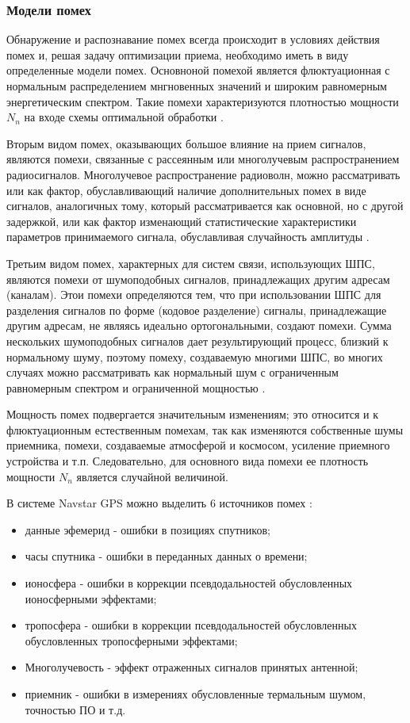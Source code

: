 \subsubsection{Модели помех}
\label{l:noise_model}
Обнаружение и распознавание помех всегда происходит в условиях действия помех и, решая задачу оптимизации приема,
необходимо иметь в виду определенные модели помех. Основноной помехой является флюктуационная с нормальным
распределением мнгновенных значений и широким равномерным энергетическим спектром. Такие помехи характеризуются
плотностью мощности ${N_n}$ на входе схемы оптимальной обработки \cite{pestryakov-book}.

Вторым видом помех, оказывающих
большое влияние на прием сигналов, являются помехи, связанные с рассеянным или многолучевым распространением
радиосигналов. Многолучевое распространение радиоволн, можно рассматривать или как фактор, обуславливающий
наличие дополнительных помех в виде сигналов, аналогичных тому, который рассматривается как основной, но с другой
задержкой, или как фактор изменающий статистические характеристики параметров принимаемого сигнала,
обуславливая случайность амплитуды \cite{pestryakov-book}.

Третьим видом помех, характерных для систем связи, использующих ШПС, являются помехи от шумоподобных сигналов,
принадлежащих другим адресам (каналам). Этои помехи определяются тем, что при использовании ШПС для разделения
сигналов по форме (кодовое разделение) сигналы, принадлежащие другим адресам, не являясь идеально ортогональными,
создают помехи. Сумма нескольких шумоподобных сигналов дает результирующий процесс, близкий к нормальному шуму,
поэтому помеху, создаваемую многими ШПС, во многих случаях можно рассматривать как нормальный шум с ограниченным
равномерным спектром и ограниченной мощностью \cite{pestryakov-book}.

Мощность помех подвергается значительным изменениям; это относится и к флюктуационным естественным помехам, так как
изменяются собственные шумы приемника, помехи, создаваемые атмосферой и космосом, усиление приемного устройства
и т.п. Следовательно, для основного вида помехи ее плотность мощности ${N_n}$ является случайной величиной.

В системе Navstar GPS можно выделить 6 источников помех \cite{parkinson_1996}:
\begin{itemize}
	\item {данные эфемерид - ошибки в позициях спутников;}
	\item {часы спутника - ошибки в переданных данных о времени;}
	\item {ионосфера - ошибки в коррекции псевдодальностей обусловленных ионосферными эффектами;}
	\item {тропосфера - ошибки в коррекции псевдодальностей обусловленных обусловленных тропосферными эффектами;}
	\item {Многолучевость - эффект отраженных сигналов принятых антенной;}
	\item {приемник - ошибки в измерениях обусловленные термальным шумом, точностью ПО и т.д.}
\end{itemize}

